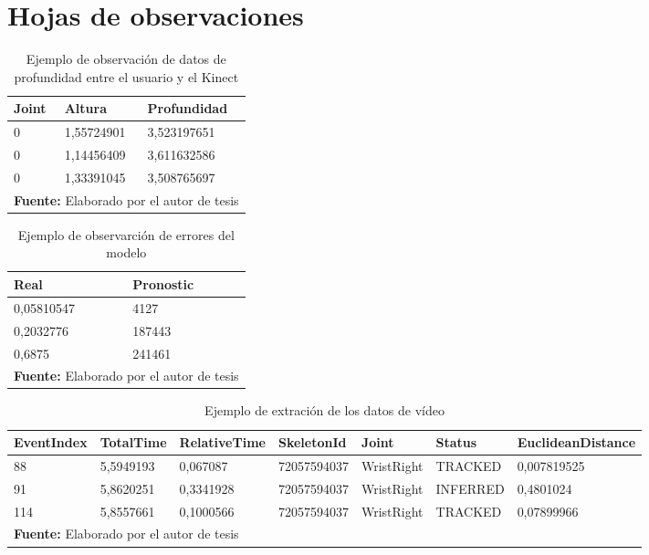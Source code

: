 \section{Hojas de observaciones}
\begin{table}[H]
\begin{center}
\caption{Ejemplo de observaci\'on de datos de profundidad entre el usuario y el Kinect}
\label{tab:obsDepth}
\begin{tabular}{|l|l|l|}
\hline
Joint & Altura & Profundidad \\ \hline
0 & 1,55724901 & 3,523197651 \\ \hline
0 & 1,14456409 & 3,611632586 \\ \hline
0 & 1,33391045 & 3,508765697 \\ \hline
\multicolumn{3}{l}{\textbf{Fuente:} Elaborado por el autor de tesis}
\end{tabular}
\end{center}
\end{table}

\begin{table}[H]
\begin{center}
\caption{Ejemplo de observarci\'on de errores del modelo}
\label{tab:obsErrores}
\begin{tabular}{|l|l|}
\hline
Real & Pronostic \\ \hline
0,05810547 & 4127 \\ \hline
0,2032776 & 187443 \\ \hline
0,6875 & 241461 \\ \hline
\multicolumn{2}{l}{\textbf{Fuente:} Elaborado por el autor de tesis}
\end{tabular}
\end{center}
\end{table}

\begin{table}[H]
\begin{center}
\caption{Ejemplo de extraci\'on de los datos de v\'ideo}
\label{tab:obsVideoData}
\begin{tabular}{|l|l|l|l|l|l|l|}
\hline
EventIndex & TotalTime & RelativeTime  & SkeletonId & Joint & Status & EuclideanDistance \\ \hline
88 & 5,5949193 & 0,067087 & 72057594037 & WristRight & TRACKED & 0,007819525\\ \hline
91 & 5,8620251 & 0,3341928 & 72057594037 & WristRight & INFERRED & 0,4801024\\ \hline
114 & 5,8557661 & 0,1000566 & 72057594037 & WristRight & TRACKED & 0,07899966\\ \hline
\multicolumn{7}{l}{\textbf{Fuente:} Elaborado por el autor de tesis}
\end{tabular}
\end{center}
\end{table}

